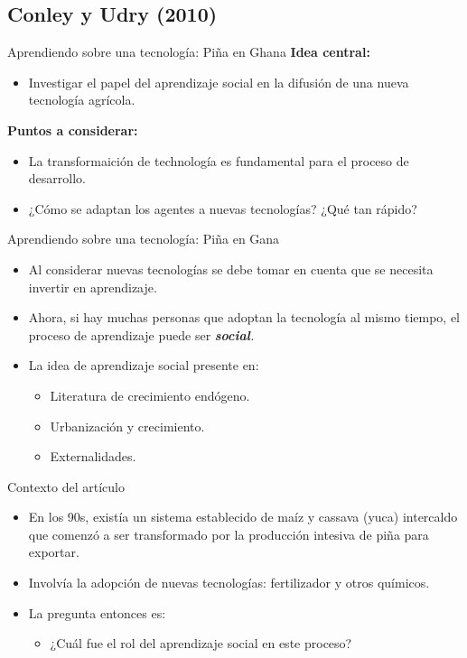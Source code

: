 \documentclass[11pt, aspectratio=169, compress]{beamer}
\begin{document}
\subsection{Conley y Udry (2010)}
\begin{frame}{Aprendiendo sobre una tecnología: Piña en Ghana}
\textbf{Idea central:}
\begin{itemize}
	\item Investigar el papel del aprendizaje social en la difusión de una nueva tecnología agrícola. 
\end{itemize}
\textbf{Puntos a considerar:}
\begin{itemize}
	\item La transformaición de technología es fundamental para el proceso de desarrollo. 
	\item ¿Cómo se adaptan los agentes a nuevas tecnologías? ¿Qué tan rápido? 
\end{itemize}
\end{frame}
\begin{frame}{Aprendiendo sobre una tecnología: Piña en Gana}
\begin{itemize}
	\item Al considerar nuevas tecnologías se debe tomar en cuenta que se necesita invertir en aprendizaje. 
	\item Ahora, si hay muchas personas que adoptan la tecnología al mismo tiempo, el proceso de aprendizaje puede ser \textit{\textbf{social}.}
	\item La idea de aprendizaje social presente en: 
	\begin{itemize}
		\item Literatura de crecimiento endógeno.  
		\item Urbanización y crecimiento. 
		\item Externalidades. 
	\end{itemize}
\end{itemize}
\end{frame}
\begin{frame}{Contexto del artículo}
\begin{itemize}
	\item En los 90s, existía un sistema establecido de maíz y cassava (yuca) intercaldo que comenzó a ser transformado por la producción intesiva de piña para exportar. 
	\item Involvía la adopción de nuevas tecnologías: fertilizador y otros químicos. 
	\item La pregunta entonces es: 
	\begin{itemize}
		\item ¿Cuál fue el rol del aprendizaje social en este proceso? 
	\end{itemize}
\end{itemize}	
\end{frame}
\end{document}
